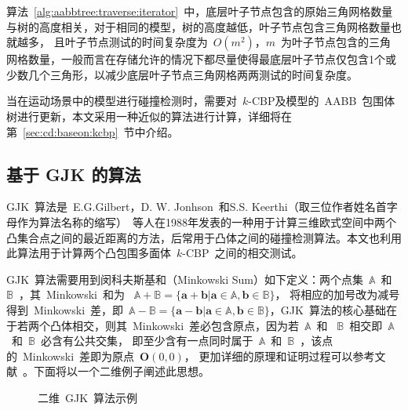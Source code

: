 算法~\ref{alg:aabbtree:traverse:iterator}~中，底层叶子节点包含的原始三角网格数量与树的高度相关，对于相同的模型，树的高度越低，叶子节点包含三角网格数量也就越多，
且叶子节点测试的时间复杂度为~$O(m^2)$，$m$~为叶子节点包含的三角网格数量，一般而言在存储允许的情况下都尽量使得最底层叶子节点仅包含1个或少数几个三角形，以减少底层叶子节点三角网格两两测试的时间复杂度。

当在运动场景中的模型进行碰撞检测时，需要对~$k$-CBP及模型的~AABB~包围体树进行更新，本文采用一种近似的算法进行计算，详细将在第~\ref{sec:cd:baseon:kcbp}~节中介绍。

\subsection{基于 GJK 的算法}
\label{subsec:kcbp:cd:gjk}

GJK~算法是~E.G.Gilbert，D. W. Jonhson~和S.S. Keerthi（取三位作者姓名首字母作为算法名称的缩写）~等人在1988年发表的一种用于计算三维欧式空间中两个凸集合点之间的最近距离的方法\cite{gilbert1988fast}，后常用于凸体之间的碰撞检测算法\cite{bergen1999fast}。本文也利用此算法用于计算两个凸包围多面体~$k$-CBP~之间的相交测试。

GJK~算法需要用到闵科夫斯基和（Minkowski Sum）如下定义：两个点集~$\mathbb{A}$~和~$\mathbb{B}$~，其~Minkowski~和为
~$\mathbb{A} + \mathbb{B} = \{ \bm{a} + \bm{b} | \bm{a} \in \mathbb{A}, \bm{b} \in \mathbb{B}\}$， 
将相应的加号改为减号得到~Minkowski~差，即~$\mathbb{A} - \mathbb{B} = \{ \bm{a} - \bm{b} | \bm{a} \in \mathbb{A}, \bm{b} \in \mathbb{B}\} $，GJK~算法的核心基础在于若两个凸体相交，则其~Minkowski~差必包含原点，因为若~$\mathbb{A}$~和
~$\mathbb{B}$~相交即~$\mathbb{A}$~和~$\mathbb{B}$~必含有公共交集，
即至少含有一点同时属于~$\mathbb{A}$~和~$\mathbb{B}$~，该点的~Minkowski~差即为原点~$\bm{O}(0, 0)$，
更加详细的原理和证明过程可以参考文献~。下面将以一个二维例子阐述此思想。

\begin{figure}[htbp]
\centering
{} 
\caption{二维~GJK~算法示例}
\label{fig:gjk:example:2d}
\end{figure}

